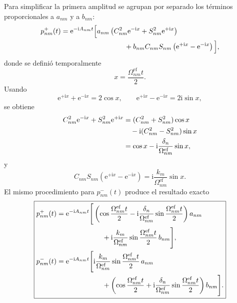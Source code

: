 \documentclass[11pt]{article}
\newcommand{\ii}{\mathrm{i}}
\newcommand{\ee}{\mathrm{e}}
\begin{document}
Para simplificar la primera amplitud se agrupan por separado los t\'erminos
proporcionales a $a_{nm}$ y a $b_{nm}$:
\begin{align}
  p_{nm}^{+}(t)
  &=
  \ee^{-\ii A_{nm}t}
  \Big[
  a_{nm}
  \left(
  C_{nm}^2\ee^{-\ii x}
  +
  S_{nm}^2\ee^{+\ii x}
  \right)
  \notag\\
  &\hspace{3.2cm}+
  b_{nm}C_{nm}S_{nm}
  \left(
  \ee^{+\ii x}-\ee^{-\ii x}
  \right)
  \Big],
\end{align}
donde se defini\'o temporalmente
\begin{equation}
  x=\frac{\Omega_{nm}^{\mathrm{ef}}t}{2}.
\end{equation}
Usando
\begin{equation}
  \ee^{+\ii x}+\ee^{-\ii x}=2\cos x,
  \qquad
  \ee^{+\ii x}-\ee^{-\ii x}=2\ii\sin x,
\end{equation}
se obtiene
\begin{align}
  C_{nm}^2\ee^{-\ii x}+S_{nm}^2\ee^{+\ii x}
  &=
  (C_{nm}^2+S_{nm}^2)\cos x
  \notag\\
  &\quad
  -\ii(C_{nm}^2-S_{nm}^2)\sin x
  \notag\\
  &=
  \cos x
  -
  \ii\frac{\delta_n}{\Omega_{nm}^{\mathrm{ef}}}\sin x,
\end{align}
y
\begin{equation}
  C_{nm}S_{nm}
  \left(\ee^{+\ii x}-\ee^{-\ii x}\right)
  =
  \ii\frac{k_m}{\Omega_{nm}^{\mathrm{ef}}}\sin x.
\end{equation}
El mismo procedimiento para $p_{nm}^{-}(t)$ produce el resultado exacto
\begin{equation}
  \boxed{
  \begin{aligned}
  p_{nm}^{+}(t)
  &=
  \ee^{-\ii A_{nm}t}
  \Bigg[
  \left(
  \cos\frac{\Omega_{nm}^{\mathrm{ef}}t}{2}
  -
  \ii\frac{\delta_n}{\Omega_{nm}^{\mathrm{ef}}}
  \sin\frac{\Omega_{nm}^{\mathrm{ef}}t}{2}
  \right)a_{nm}
  \\
  &\hspace{2.3cm}+
  \ii\frac{k_m}{\Omega_{nm}^{\mathrm{ef}}}
  \sin\frac{\Omega_{nm}^{\mathrm{ef}}t}{2}
  \,b_{nm}
  \Bigg],
  \\
  p_{nm}^{-}(t)
  &=
  \ee^{-\ii A_{nm}t}
  \Bigg[
  \ii\frac{k_m}{\Omega_{nm}^{\mathrm{ef}}}
  \sin\frac{\Omega_{nm}^{\mathrm{ef}}t}{2}
  \,a_{nm}
  \\
  &\hspace{2.3cm}+
  \left(
  \cos\frac{\Omega_{nm}^{\mathrm{ef}}t}{2}
  +
  \ii\frac{\delta_n}{\Omega_{nm}^{\mathrm{ef}}}
  \sin\frac{\Omega_{nm}^{\mathrm{ef}}t}{2}
  \right)b_{nm}
  \Bigg].
  \end{aligned}
  }
\end{equation}
\end{document}
